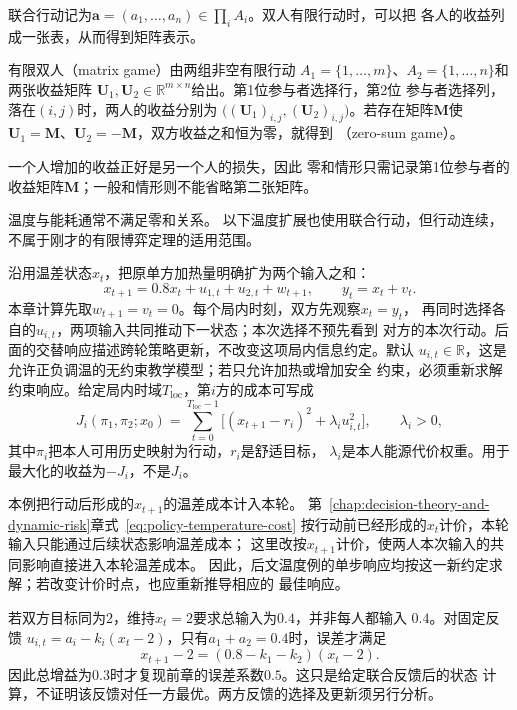 联合行动记为\(\bm a=(a_1,\ldots,a_n)\in\prod_i A_i\)。双人有限行动时，可以把
各人的收益列成一张表，从而得到矩阵表示。
\begin{definition}[有限矩阵博弈]
\label{def:game-finite-matrix-game}
有限双人（matrix game）由两组非空有限行动
\(A_1=\{1,\ldots,m\}\)、\(A_2=\{1,\ldots,n\}\)和两张收益矩阵
\(\bm{U}_1,\bm{U}_2\in\mathbb{R}^{m\times n}\)给出。第1位参与者选择行，第2位
参与者选择列，落在\((i,j)\)时，两人的收益分别为
\(\bigl((\bm{U}_1)_{i,j},(\bm{U}_2)_{i,j}\bigr)\)。若存在矩阵\(\bm{M}\)使
\(\bm{U}_1=\bm{M}\)、\(\bm{U}_2=-\bm{M}\)，双方收益之和恒为零，就得到
（zero-sum game）。
\end{definition}
一个人增加的收益正好是另一个人的损失，因此
零和情形只需记录第1位参与者的收益矩阵\(\bm{M}\)；一般和情形则不能省略第二张矩阵。

温度与能耗通常不满足零和关系。
以下温度扩展也使用联合行动，但行动连续，不属于刚才的有限博弈定理的适用范围。

\begin{example}[两方共同加热的状态与成本]
\label{ex:game-two-heaters}
沿用温差状态\(x_t\)，把原单方加热量明确扩为两个输入之和：
\begin{equation}
  x_{t+1}=0.8x_t+u_{1,t}+u_{2,t}+w_{t+1},
  \qquad y_t=x_t+v_t.
  \label{eq:game-two-heater-dynamics}
\end{equation}
本章计算先取\(w_{t+1}=v_t=0\)。每个局内时刻，双方先观察\(x_t=y_t\)，
再同时选择各自的\(u_{i,t}\)，两项输入共同推动下一状态；本次选择不预先看到
对方的本次行动。后面的交替响应描述跨轮策略更新，不改变这项局内信息约定。默认
\(u_{i,t}\in\mathbb R\)，这是允许正负调温的无约束教学模型；若只允许加热或增加安全
约束，必须重新求解约束响应。给定局内时域\(T_{\mathrm{loc}}\)，第\(i\)方的成本可写成
\[
  J_i(\pi_1,\pi_2;x_0)
  =\sum_{t=0}^{T_{\mathrm{loc}}-1}
  \bigl[(x_{t+1}-r_i)^2+\lambda_i u_{i,t}^2\bigr],
  \qquad \lambda_i>0,
\]
其中\(\pi_i\)把本人可用历史映射为行动，\(r_i\)是舒适目标，
\(\lambda_i\)是本人能源代价权重。用于最大化的收益为\(-J_i\)，不是\(J_i\)。

本例把行动后形成的\(x_{t+1}\)的温差成本计入本轮。
第~\ref{chap:decision-theory-and-dynamic-risk}章式~\eqref{eq:policy-temperature-cost}
按行动前已经形成的\(x_t\)计价，本轮输入只能通过后续状态影响温差成本；
这里改按\(x_{t+1}\)计价，使两人本次输入的共同影响直接进入本轮温差成本。
因此，后文温度例的单步响应均按这一新约定求解；若改变计价时点，也应重新推导相应的
最佳响应。
\end{example}

若双方目标同为\(2\)，维持\(x_t=2\)要求总输入为\(0.4\)，并非每人都输入
\(0.4\)。对固定反馈
\(u_{i,t}=a_i-k_i(x_t-2)\)，只有\(a_1+a_2=0.4\)时，误差才满足
\[
  x_{t+1}-2=(0.8-k_1-k_2)(x_t-2).
\]
因此总增益为\(0.3\)时才复现前章的误差系数\(0.5\)。这只是给定联合反馈后的状态
计算，不证明该反馈对任一方最优。两方反馈的选择及更新须另行分析。

